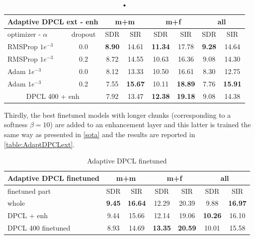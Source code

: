 \documentclass[master, tikz, final,11pt, dvipdfmx]{iscs-thesis}
\begin{document}
\begin{table}[h]
\centering
\begin{tabular}{l|c|c|c|c|c|c|c}
\multicolumn{2}{c|}{Adaptive DPCL ext - enh} & \multicolumn{2}{c|}{m+m} & \multicolumn{2}{c|}{m+f} & \multicolumn{2}{c}{all} \\ 
\hline 
optimizer - $\alpha$ & dropout & SDR & SIR & SDR & SIR & SDR & SIR \\ 
\hline 
RMSProp $1e^{-3}$ & 0.0 & \cellcolor{green}\textbf{8.90} & \cellcolor{green}14.61 & \cellcolor{green}\textbf{11.34} & 1\cellcolor{green}7.78 & \cellcolor{green}\textbf{9.28} & \cellcolor{green}14.64 \\ 
RMSProp $1e^{-3}$ & 0.2 & 8.72 & 14.55 & 10.63 & 16.36 & 9.08 & 14.30 \\ 
Adam $1e^{-3}$ & 0.0 & 8.12 & 13.33 & 10.50 & 16.61 & 8.30 & 12.75 \\ 
Adam $1e^{-3}$ & 0.2 & 7.55 & \textbf{15.67} & 10.11 & \textbf{18.89} & 7.76 & \textbf{15.91} \\ 
\hline 
\hline 
\multicolumn{2}{c|}{DPCL 400 + enh}
 & 7.92 & 13.47 & \textbf{12.38} & \textbf{19.18} & 9.08 & 14.38 \\ 
\end{tabular}
\captionsetup{justification=centering}
\caption{•}
\label{table:AdaptDPCLext}
\end{table}

Thirdly, the best finetuned models with longer chunks (corresponding to a softness $\beta=10$) are added to an enhancement layer and this latter is trained the same way as presented in \autoref{sota} and the results are reported in \autoref{table:AdaptDPCLext}.

\begin{table}[h]
\centering
\begin{tabular}{l|c|c|c|c|c|c}
Adaptive DPCL finetuned & \multicolumn{2}{c|}{m+m} & \multicolumn{2}{c|}{m+f} & \multicolumn{2}{c}{all} \\ 
\hline 
finetuned part & SDR & SIR & SDR & SIR & SDR & SIR \\ 
\hline 
whole & \textbf{9.45} & \textbf{16.64} & 12.29 & 20.39 & 9.88 & \textbf{16.97} \\  
DPCL + enh & 9.44 & 15.66 & 12.14 & 19.06 & \textbf{10.26} & 16.10 \\ 
\hline
\hline 
DPCL 400 finetuned & 8.93 & 14.69 & \textbf{13.35} &\textbf{ 20.59} & 10.01 & 15.58 \\ 
\end{tabular}
\captionsetup{justification=centering}
\caption[Adaptive DPCL finetuned]{Adaptive DPCL finetuned}
\label{table:AdaptDPCLext}
\end{table}
\end{document}
